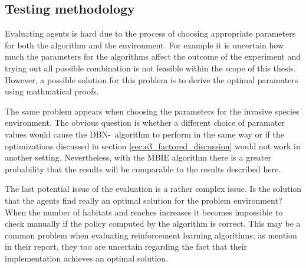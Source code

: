 \subsection{Testing methodology}

Evaluating agents is hard due to the process of choosing appropriate parameters
for both the algorithm and the environment. For example it is uncertain how
much the parameters for the algorithms affect the outcome of the experiment and
trying out all possible combination is not feasible within the scope of this
thesis. However, a possible solution for this problem is to derive the optimal
paramaters using mathmatical proofs.

The same problem appears when choosing the parameters for the invasive species
environment. The obvious question is whether a different choice of paramater values 
would cause the DBN-\etre\ algorithm to perform in the same way or if the optimizations
discussed in section \ref{sec:e3_factored_discussion} would not work in
another setting. Nevertheless, with the MBIE algorithm there is a greater
probability that the results will be comparable to the results described here.

The last potential issue of the evaluation is a rather complex issue. Is the solution that the agents find really an optimal solution for the problem environment? When the number of habitats and reaches increases it becomes impossible to check manually if the policy computed by the algorithm is correct. This may be a common problem when evaluating reinforcement learning algorithms; as \textcite{dietterich2013pac} mention in their report, they too are uncertain regarding the fact that their implementation achieves an optimal solution. 

